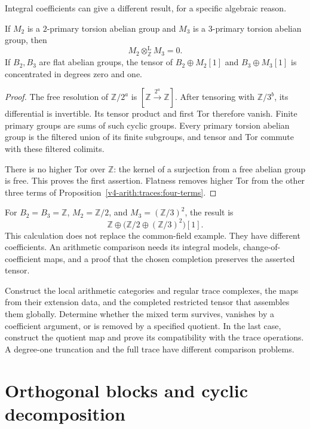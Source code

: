 Integral coefficients can give a different result, for a specific algebraic
reason.

\begin{proposition}
\label{v4-arith:traces:primary-vanishing}
If $M_2$ is a $2$-primary torsion abelian group and $M_3$ is a $3$-primary
torsion abelian group, then
\[
 M_2\otimes_{\mathbb Z}^{\mathrm L}M_3=0.
\]
If $B_2,B_3$ are flat abelian groups, the tensor of $B_2\oplus M_2[1]$ and
$B_3\oplus M_3[1]$ is concentrated in degrees zero and one.
\end{proposition}
\begin{proof}
The free resolution of $\mathbb Z/2^a$ is $[\mathbb
Z\xrightarrow{2^a}\mathbb Z]$. After tensoring with $\mathbb Z/3^b$, its
differential is invertible. Its tensor product and first Tor therefore
vanish. Finite primary groups are sums of such cyclic groups. Every primary
torsion abelian group is the filtered union of its finite subgroups, and
tensor and Tor commute with these filtered colimits.

There is no higher Tor over $\mathbb Z$: the kernel of a surjection from a
free abelian group is free. This proves the first assertion. Flatness
removes higher Tor from the other three terms of
Proposition~\ref{v4-arith:traces:four-terms}.
\end{proof}

For $B_2=B_3=\mathbb Z$, $M_2=\mathbb Z/2$, and $M_3=(\mathbb Z/3)^2$, the
result is
\[
 \mathbb Z\oplus
   \bigl(\mathbb Z/2\oplus(\mathbb Z/3)^2\bigr)[1].
\]
This calculation does not replace the common-field example. They have
different coefficients. An arithmetic comparison needs its integral models,
change-of-coefficient maps, and a proof that the chosen completion preserves
the asserted tensor.

\begin{question}
\label{v4-arith:traces:arithmetic-assembly}
Construct the local arithmetic categories and regular trace complexes, the
maps from their extension data, and the completed restricted tensor that
assembles them globally. Determine whether the mixed term survives, vanishes
by a coefficient argument, or is removed by a specified quotient. In the
last case, construct the quotient map and prove its compatibility with the
trace operations. A degree-one truncation and the full trace have different
comparison problems.
\end{question}

\section{Orthogonal blocks and cyclic decomposition}

